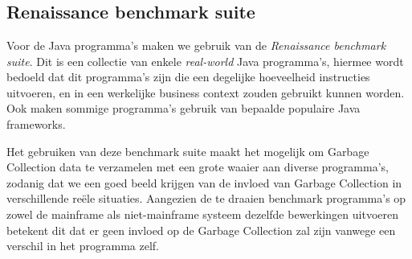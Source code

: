 
\chapter{}%
\label{ch:methodologie}








\section{Renaissance benchmark suite}
Voor de Java programma's maken we gebruik van de \textit{Renaissance benchmark suite}.
Dit is een collectie van enkele \textit{real-world} Java programma's, hiermee wordt bedoeld dat dit programma's zijn die een degelijke hoeveelheid instructies uitvoeren, en in een werkelijke business context zouden gebruikt kunnen worden. 
Ook maken sommige programma's gebruik van bepaalde populaire Java frameworks.



Het gebruiken van deze benchmark suite maakt het mogelijk om Garbage Collection data te verzamelen met een grote waaier aan diverse programma's, zodanig dat we een goed beeld krijgen van de invloed van Garbage Collection in verschillende reële situaties.
Aangezien de te draaien benchmark programma's op zowel de mainframe als niet-mainframe systeem dezelfde bewerkingen uitvoeren betekent dit dat er geen invloed op de Garbage Collection zal zijn vanwege een verschil in het programma zelf.


